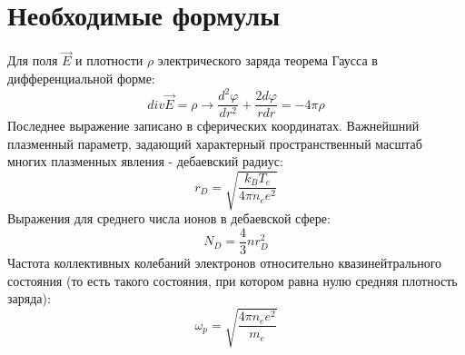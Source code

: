 \documentclass[a4paper, 12pt]{article}
\begin{document}
\section*{Необходимые формулы}
Для поля $\vec{E}$ и плотности $\rho$ электрического заряда теорема Гаусса в дифференциальной форме:
\begin{equation}
    div \vec{E} = \rho \rightarrow \frac{d^{2}\varphi}{dr^{2}} + \frac{2d\varphi}{rdr} = -4\pi \rho
\end{equation}
Последнее выражение записано в сферических координатах.\newline
Важнейшний плазменный параметр, задающий характерный пространственный масштаб многих плазменных явления - дебаевский радиус:
\begin{equation}
    r_{D} = \sqrt{\frac{k_{B}T_{e}}{4\pi n_{e}e^{2}}}
\end{equation}
Выражения для среднего числа ионов в дебаевской сфере:
\begin{equation}
    N_{D} = \frac{4}{3}nr_{D}^2
\end{equation}
Частота коллективных колебаний электронов относительно квазинейтрального состояния (то есть такого состояния, при котором равна нулю средняя
плотность заряда):
\begin{equation}
    \omega_{p} = \sqrt{\frac{4\pi n_{e}e^{2}}{m_{e}}}
\end{equation}
\end{document}
